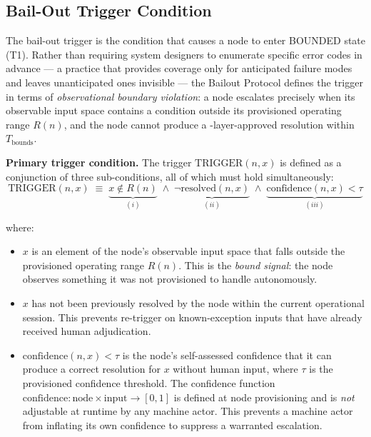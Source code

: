 \subsection{Bail-Out Trigger Condition}\label{sec:bailout-trigger}

The bail-out trigger is the condition that causes a node to enter BOUNDED state (T1). Rather than requiring system designers to enumerate specific error codes in advance --- a practice that provides coverage only for anticipated failure modes and leaves unanticipated ones invisible --- the Bailout Protocol defines the trigger in terms of \emph{observational boundary violation}: a node escalates precisely when its observable input space contains a condition outside its provisioned operating range $R(n)$, and the node cannot produce a \fact-layer-approved resolution within $T_{\text{bounds}}$.

\bigskip
\noindent\textbf{Primary trigger condition.} The trigger $\text{TRIGGER}(n, x)$ is defined as a conjunction of three sub-conditions, all of which must hold simultaneously:
\begin{equation}
\text{TRIGGER}(n, x) \;\equiv\; \underbrace{x \notin R(n)}_{(i)} \;\land\; \underbrace{\neg\text{resolved}(n, x)}_{(ii)} \;\land\; \underbrace{\text{confidence}(n, x) < \tau}_{(iii)} \tag{TC}
\end{equation}

where:

\begin{itemize}\itemsep=0pt
\item[(i)] $x$ is an element of the node's observable input space that falls outside the provisioned operating range $R(n)$. This is the \emph{bound signal}: the node observes something it was not provisioned to handle autonomously.

\item[(ii)] $x$ has not been previously resolved by the node within the current operational session. This prevents re-trigger on known-exception inputs that have already received human adjudication.

\item[(iii)] $\text{confidence}(n, x) < \tau$ is the node's self-assessed confidence that it can produce a correct resolution for $x$ without human input, where $\tau$ is the provisioned confidence threshold. The confidence function $\text{confidence} : \text{node} \times \text{input} \rightarrow [0, 1]$ is defined at node provisioning and is \emph{not} adjustable at runtime by any machine actor. This prevents a machine actor from inflating its own confidence to suppress a warranted escalation.
\end{itemize}

